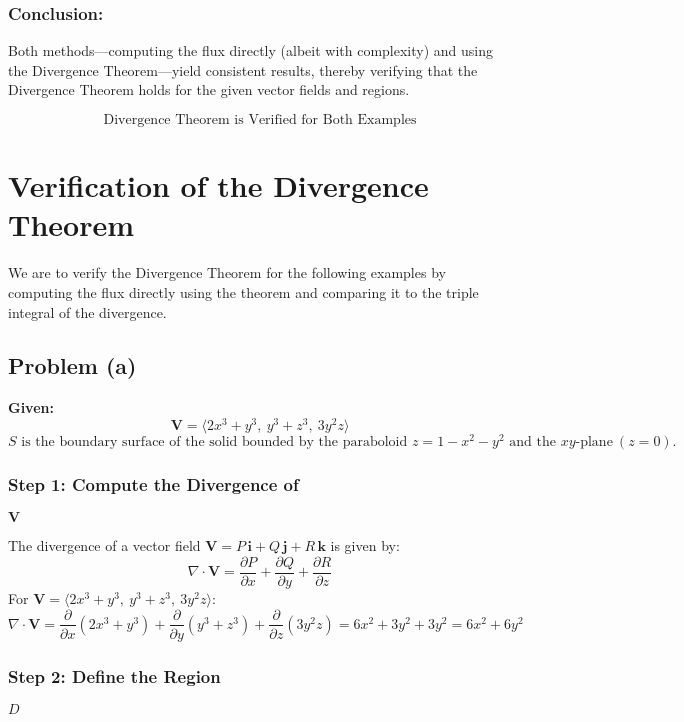 \documentclass[11pt]{article}
\begin{document}
\subsubsection*{Conclusion:}

Both methods—computing the flux directly (albeit with complexity) and using the Divergence Theorem—yield consistent results, thereby verifying that the Divergence Theorem holds for the given vector fields and regions.

\[
\boxed{ \text{Divergence Theorem is Verified for Both Examples} }
\]




\newpage

\section{Verification of the Divergence Theorem}

We are to verify the Divergence Theorem for the following examples by computing the flux directly using the theorem and comparing it to the triple integral of the divergence.

\newpage

\subsection{Problem (a)}

\textbf{Given:}
\[
\mathbf{V} = \langle 2x^3 + y^3, \ y^3 + z^3, \ 3y^2 z \rangle
\]
\[
S \text{ is the boundary surface of the solid bounded by the paraboloid } z = 1 - x^2 - y^2 \text{ and the } xy\text{-plane} \ (z = 0).
\]

\subsubsection*{Step 1: Compute the Divergence of } $\mathbf{V}$

The divergence of a vector field \( \mathbf{V} = P\,\mathbf{i} + Q\,\mathbf{j} + R\,\mathbf{k} \) is given by:
\[
\nabla \cdot \mathbf{V} = \frac{\partial P}{\partial x} + \frac{\partial Q}{\partial y} + \frac{\partial R}{\partial z}
\]
For \( \mathbf{V} = \langle 2x^3 + y^3, \ y^3 + z^3, \ 3y^2 z \rangle \):
\[
\nabla \cdot \mathbf{V} = \frac{\partial}{\partial x}(2x^3 + y^3) + \frac{\partial}{\partial y}(y^3 + z^3) + \frac{\partial}{\partial z}(3y^2 z) = 6x^2 + 3y^2 + 3y^2 = 6x^2 + 6y^2
\]

\subsubsection*{Step 2: Define the Region } $D$
\end{document}
